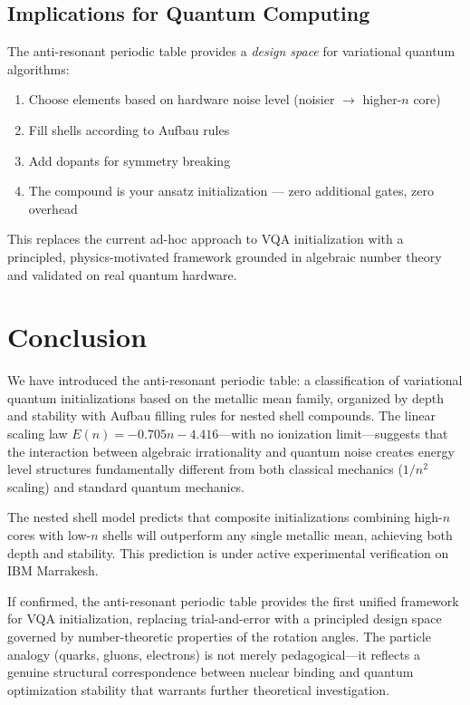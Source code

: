\documentclass[twocolumn,showpacs,preprintnumbers,amsmath,amssymb,aps,prl]{revtex4-2}
\begin{document}
\subsection{Implications for Quantum Computing}

The anti-resonant periodic table provides a \emph{design space} for variational quantum algorithms:
\begin{enumerate}
    \item Choose elements based on hardware noise level (noisier $\to$ higher-$n$ core)
    \item Fill shells according to Aufbau rules
    \item Add dopants for symmetry breaking
    \item The compound is your ansatz initialization --- zero additional gates, zero overhead
\end{enumerate}

This replaces the current ad-hoc approach to VQA initialization with a principled, physics-motivated framework grounded in algebraic number theory and validated on real quantum hardware.


\section{Conclusion}
\label{sec:conclusion}

We have introduced the anti-resonant periodic table: a classification of variational quantum initializations based on the metallic mean family, organized by depth and stability with Aufbau filling rules for nested shell compounds. The linear scaling law $E(n) = -0.705n - 4.416$---with no ionization limit---suggests that the interaction between algebraic irrationality and quantum noise creates energy level structures fundamentally different from both classical mechanics ($1/n^2$ scaling) and standard quantum mechanics.

The nested shell model predicts that composite initializations combining high-$n$ cores with low-$n$ shells will outperform any single metallic mean, achieving both depth and stability. This prediction is under active experimental verification on IBM Marrakesh.

If confirmed, the anti-resonant periodic table provides the first unified framework for VQA initialization, replacing trial-and-error with a principled design space governed by number-theoretic properties of the rotation angles. The particle analogy (quarks, gluons, electrons) is not merely pedagogical---it reflects a genuine structural correspondence between nuclear binding and quantum optimization stability that warrants further theoretical investigation.
\end{document}
